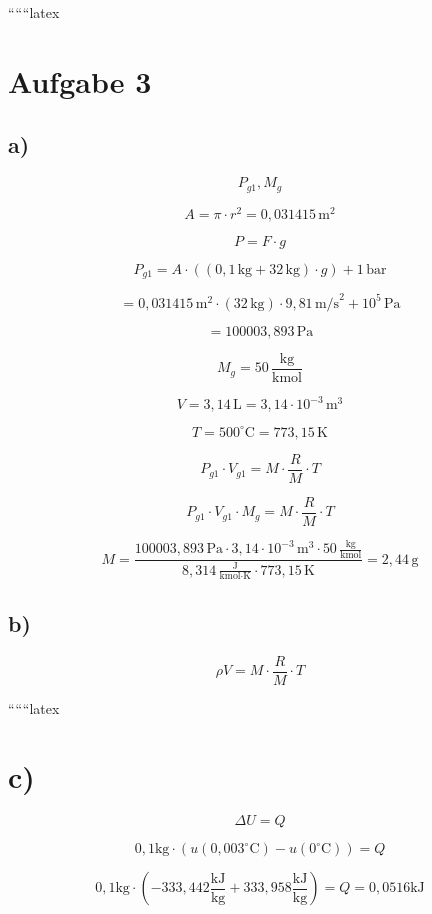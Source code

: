 
``````latex


\section*{Aufgabe 3}

\subsection*{a)}

\[
P_{g1}, M_g
\]

\[
A = \pi \cdot r^2 = 0{,}031415 \, \text{m}^2
\]

\[
P = F \cdot g
\]

\[
P_{g1} = A \cdot \left( (0{,}1 \, \text{kg} + 32 \, \text{kg}) \cdot g \right) + 1 \, \text{bar}
\]

\[
= 0{,}031415 \, \text{m}^2 \cdot (32 \, \text{kg}) \cdot 9{,}81 \, \text{m/s}^2 + 10^5 \, \text{Pa}
\]

\[
= 100003{,}893 \, \text{Pa}
\]

\[
M_g = 50 \, \frac{\text{kg}}{\text{kmol}}
\]

\[
V = 3{,}14 \, \text{L} = 3{,}14 \cdot 10^{-3} \, \text{m}^3
\]

\[
T = 500^\circ \text{C} = 773{,}15 \, \text{K}
\]

\[
P_{g1} \cdot V_{g1} = M \cdot \frac{R}{M} \cdot T
\]

\[
P_{g1} \cdot V_{g1} \cdot M_g = M \cdot \frac{R}{M} \cdot T
\]

\[
M = \frac{100003{,}893 \, \text{Pa} \cdot 3{,}14 \cdot 10^{-3} \, \text{m}^3 \cdot 50 \, \frac{\text{kg}}{\text{kmol}}}{8{,}314 \, \frac{\text{J}}{\text{kmol} \cdot \text{K}} \cdot 773{,}15 \, \text{K}} = 2{,}44 \, \text{g}
\]

\subsection*{b)}

\[
\rho V = M \cdot \frac{R}{M} \cdot T
\]

``````latex


\section*{c)}

\[
\Delta U = Q
\]

\[
0{,}1 \text{kg} \cdot (u(0{,}003^\circ \text{C}) - u(0^\circ \text{C})) = Q
\]

\[
0{,}1 \text{kg} \cdot (-333{,}442 \frac{\text{kJ}}{\text{kg}} + 333{,}958 \frac{\text{kJ}}{\text{kg}}) = Q = 0{,}0516 \text{kJ}
\]

